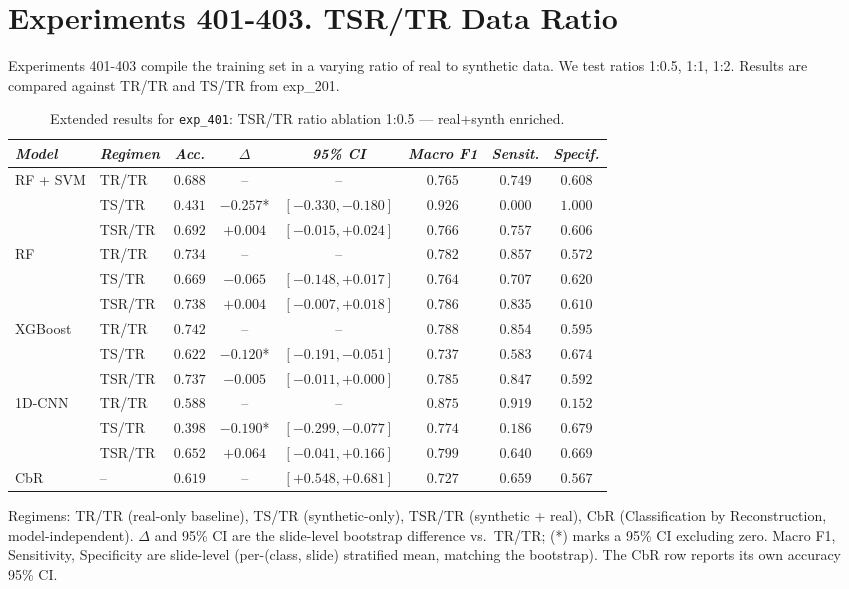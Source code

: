 \newpage

\section*{Experiments 401-403. TSR/TR Data Ratio }
Experiments 401-403 compile the training set in a varying ratio of real to synthetic data. We test ratios 1:0.5, 1:1, 1:2. Results are compared against TR/TR and TS/TR from exp\_201. 

\begin{table}[htp]
\centering
\scriptsize 
\caption{Extended results for \texttt{exp\_401}: TSR/TR ratio ablation 1:0.5 — real+synth enriched.}
\label{tab:appendix_exp_401}
\begin{tabular*}{\textwidth}{@{\extracolsep{\fill}}llcccccc}
\toprule
\emph{Model} & \emph{Regimen} & \emph{Acc.} & \emph{$\Delta$} & \emph{95\% CI} & \emph{Macro F1} & \emph{Sensit.} & \emph{Specif.}\\
\midrule
\multirow{3}{*}{RF + SVM} & TR/TR & $0.688$ & -- & -- & $0.765$ & $0.749$ & $0.608$\\
 & TS/TR & $0.431$ & $-0.257$* & $[-0.330, -0.180]$ & $0.926$ & $0.000$ & $1.000$\\
 & TSR/TR & $0.692$ & $+0.004$ & $[-0.015, +0.024]$ & $0.766$ & $0.757$ & $0.606$\\
\midrule
\multirow{3}{*}{RF} & TR/TR & $0.734$ & -- & -- & $0.782$ & $0.857$ & $0.572$\\
 & TS/TR & $0.669$ & $-0.065$ & $[-0.148, +0.017]$ & $0.764$ & $0.707$ & $0.620$\\
 & TSR/TR & $0.738$ & $+0.004$ & $[-0.007, +0.018]$ & $0.786$ & $0.835$ & $0.610$\\
\midrule
\multirow{3}{*}{XGBoost} & TR/TR & $0.742$ & -- & -- & $0.788$ & $0.854$ & $0.595$\\
 & TS/TR & $0.622$ & $-0.120$* & $[-0.191, -0.051]$ & $0.737$ & $0.583$ & $0.674$\\
 & TSR/TR & $0.737$ & $-0.005$ & $[-0.011, +0.000]$ & $0.785$ & $0.847$ & $0.592$\\
\midrule
\multirow{3}{*}{1D-CNN} & TR/TR & $0.588$ & -- & -- & $0.875$ & $0.919$ & $0.152$\\
 & TS/TR & $0.398$ & $-0.190$* & $[-0.299, -0.077]$ & $0.774$ & $0.186$ & $0.679$\\
 & TSR/TR & $0.652$ & $+0.064$ & $[-0.041, +0.166]$ & $0.799$ & $0.640$ & $0.669$\\
\midrule
CbR & -- & $0.619$ & -- & $[+0.548, +0.681]$ & $0.727$ & $0.659$ & $0.567$\\
\bottomrule
\end{tabular*}
\small{Regimens: TR/TR (real-only baseline), TS/TR (synthetic-only), TSR/TR (synthetic + real), CbR (Classification by Reconstruction, model-independent). $\Delta$ and 95\% CI are the slide-level bootstrap difference vs.\ TR/TR; (*) marks a 95\% CI excluding zero. Macro F1, Sensitivity, Specificity are slide-level (per-(class, slide) stratified mean, matching the bootstrap). The CbR row reports its own accuracy 95\% CI.}
\end{table}

